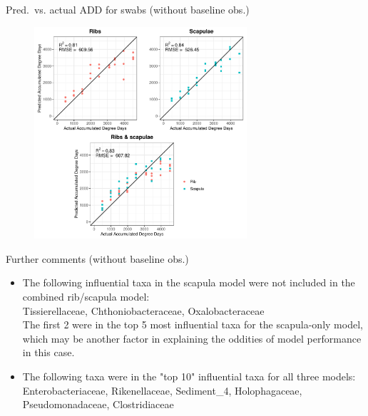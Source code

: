 \documentclass{beamer}
\begin{document}
\begin{frame}{Pred.\ vs. actual ADD for swabs (without baseline obs.)}

  \begin{center}
    \begin{figure}
      \includegraphics[height=3.1in]
        {w_swabs/bacteria/use_families/hl_combined_family_no_baseline_predicted_vs_actual_ADD}
    \end{figure}
  \end{center}
    
\end{frame}



\begin{frame}{Further comments (without baseline obs.)}
  
  \begin{itemize}
    \item The following influential taxa in the scapula model were not included
    in the combined rib/scapula model:\\
    Tissierellaceae, Chthoniobacteraceae, Oxalobacteraceae\\
    The first 2 were in the top 5 most influential taxa for the scapula-only
    model, which may be another factor in explaining the oddities of model
    performance in this case.
    \item The following taxa were in the "top 10" influential taxa for all
    three models:\\
    Enterobacteriaceae, Rikenellaceae, Sediment\_4, Holophagaceae,
    Pseudomonadaceae, Clostridiaceae
    
  \end{itemize}

\end{frame}
\end{document}
